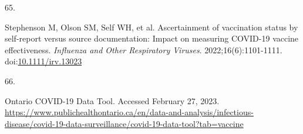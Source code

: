 \documentclass[
  letterpaper,
  DIV=11,
  numbers=noendperiod]{scrartcl}
\newlength{\cslhangindent}
\newlength{\csllabelwidth}
\newlength{\cslentryspacingunit} %
\newenvironment{CSLReferences}[2] %
 {%
  \setlength{\parindent}{0pt}
  \ifodd #1
  \let\oldpar\par
  \def\par{\hangindent=\cslhangindent\oldpar}
  \fi
  \setlength{\parskip}{#2\cslentryspacingunit}
 }%
 {}
\newcommand{\CSLLeftMargin}[1]{\parbox[t]{\csllabelwidth}{#1}}
\newcommand{\CSLRightInline}[1]{\parbox[t]{\linewidth - \csllabelwidth}{#1}\break}
\begin{document}
\begin{CSLReferences}{0}{0}
\leavevmode{}%
\CSLLeftMargin{65. }%
\CSLRightInline{Stephenson M, Olson SM, Self WH, et al. Ascertainment of
vaccination status by self-report versus source documentation: Impact on
measuring {COVID}-19 vaccine effectiveness. \emph{Influenza and Other
Respiratory Viruses}. 2022;16(6):1101-1111.
doi:\href{https://doi.org/10.1111/irv.13023}{10.1111/irv.13023}}

\leavevmode{}%
\CSLLeftMargin{66. }%
\CSLRightInline{{Ontario COVID-19 Data Tool}. Accessed February 27,
2023.
\url{https://www.publichealthontario.ca/en/data-and-analysis/infectious-disease/covid-19-data-surveillance/covid-19-data-tool?tab=vaccine}}

\end{CSLReferences}
\end{document}
